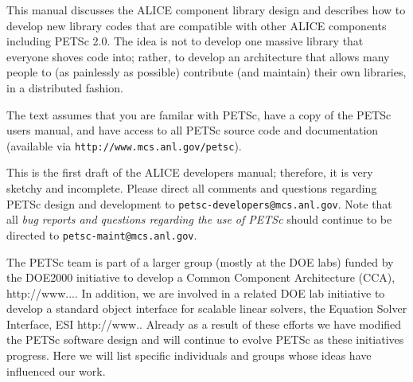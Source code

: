 This manual discusses the ALICE component library design and describes
how to develop new library codes that are compatible with other ALICE components 
including PETSc 2.0.
The idea is not to develop one massive library that everyone shoves code 
into; rather, to develop an architecture that allows many people
to (as painlessly as possible) contribute (and maintain) their own libraries,
in a distributed fashion.

The text assumes
that you are familar with PETSc, have a copy of the PETSc users
manual, and have access to all PETSc source code and documentation
(available via {\tt http://www.mcs.anl.gov/petsc}).


\vspace{1cm}

This is the first draft of the ALICE developers manual;
therefore, it is very sketchy and incomplete. Please
direct all comments and questions regarding PETSc design and
development to {\tt petsc-developers@mcs.anl.gov}.  Note that all {\em
bug reports and questions regarding the use of PETSc} should continue
to be directed to {\tt petsc-maint@mcs.anl.gov}.

The PETSc team is part of a larger group (mostly at the DOE labs)
funded by the DOE2000 initiative to develop a Common Component
Architecture (CCA), http://www.... In addition, we are involved in a
related DOE lab initiative to develop a standard object interface for
scalable linear solvers, the Equation Solver Interface, ESI
http://www..  Already as a result of these efforts we have modified
the PETSc software design and will continue to evolve PETSc as these
initiatives progress. Here we will list specific individuals and
groups whose ideas have influenced our work.

%
%

\newpage
\hbox{ }
\newpage

